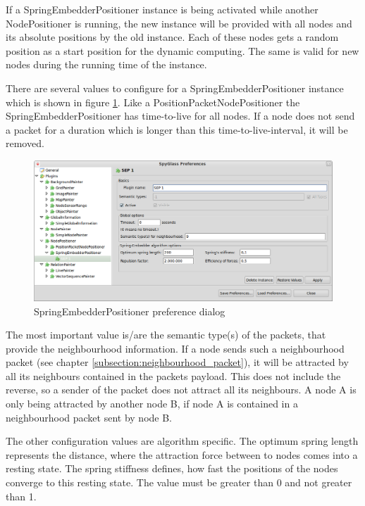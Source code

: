 If a SpringEmbedderPositioner instance is being activated while another NodePositioner is running, the new
instance will be provided with all nodes and its absolute positions by the old instance. Each of these nodes
gets a random position as a start position for the dynamic computing. The same is valid for new nodes during
the running time of the instance.

There are several values to configure for a SpringEmbedderPositioner instance which is shown in figure
\ref{pic:sep_preferences}. Like a PositionPacketNodePositioner
the SpringEmbedderPositioner has time-to-live for all nodes. If a node does not send a packet for a duration
which is longer than this time-to-live-interval, it will be removed.

\begin{figure}[htb]
  \begin{center}
    \includegraphics[width=13.2cm]{./pics/springembedderpositioner_prefpage}
    \caption{SpringEmbedderPositioner preference dialog}
    \label{pic:sep_preferences}
  \end{center}
\end{figure}

The most important value is/are the semantic type(s) of the packets, that provide the neighbourhood information.
If a node sends such a neighbourhood packet (see chapter \ref{subsection:neighbourhood_packet}), it will be
attracted by all its neighbours contained in the packets payload. This does not include the reverse, so a sender of the
packet does not attract all its neighbours. A node A is only being attracted by another node B, if node A is contained
in a neighbourhood packet sent by node B.

The other configuration values are algorithm specific. The optimum spring length represents the distance, where the
attraction force between to nodes comes into a resting state. The spring stiffness defines, how fast the positions
of the nodes converge to this resting state. The value must be greater than 0 and not greater than 1.

